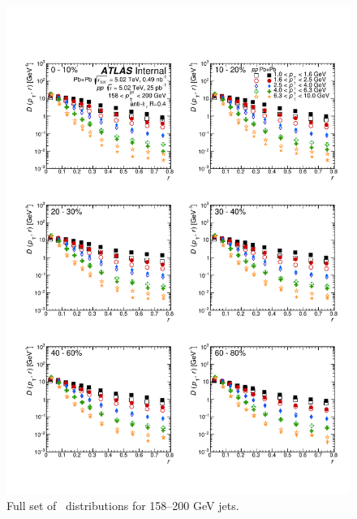 \begin{figure}[h]
\includegraphics[width=1.0\textwidth]{figures/results/DpT_dR_jet8.pdf}
\caption{Full set of \Dptr\ distributions for 158--200 GeV jets.}
\label{fig:fullset_dptr_j8}
\end{figure}

